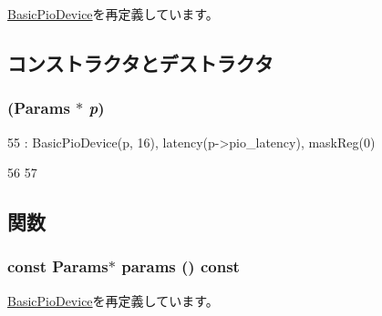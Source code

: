 \hyperlink{classBasicPioDevice_a2845515ac6467f10540747053c8a0449}{BasicPioDevice}を再定義しています。

\subsection{コンストラクタとデストラクタ}
\hypertarget{classX86ISA_1_1I8237_af0eeaf391b6f5fc24806aaf7f543bac8}{
\subsubsection[{I8237}]{ ({\bf Params} $\ast$ {\em p})}}
\label{classX86ISA_1_1I8237_af0eeaf391b6f5fc24806aaf7f543bac8}



\begin{DoxyCode}
55                      : BasicPioDevice(p, 16), latency(p->pio_latency), maskReg(0)
      
56     {
57     }
\end{DoxyCode}


\subsection{関数}
\hypertarget{classX86ISA_1_1I8237_acd3c3feb78ae7a8f88fe0f110a718dff}{
\subsubsection[{params}]{\setlength{\rightskip}{0pt plus 5cm}const {\bf Params}$\ast$ params () const}}
\label{classX86ISA_1_1I8237_acd3c3feb78ae7a8f88fe0f110a718dff}


\hyperlink{classBasicPioDevice_acd3c3feb78ae7a8f88fe0f110a718dff}{BasicPioDevice}を再定義しています。


